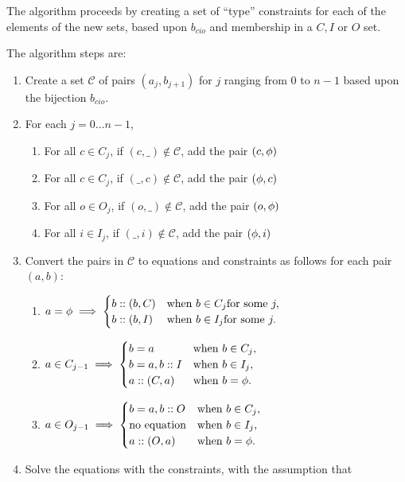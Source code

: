 The algorithm proceeds by creating a set of ``type'' constraints for each of
the elements of the new sets, based upon $b_{cio}$ and membership in a $C,I$
or $O$ set.

The algorithm steps are:
\begin{enumerate}
  \item Create a set $\mathcal{C}$ of pairs $(a_j,b_{j+1})$ for $j$
  ranging from $0$ to $n-1$ based upon the bijection $b_{cio}$.
  \item For each $j=0\ldots n-1$,
  \begin{enumerate}
    \item For all $c\in C_j$, if $(c,\_)\notin\mathcal{C}$,
      add the pair $(c,\phi)$
    \item For all $c\in C_j$, if $(\_,c)\notin\mathcal{C}$,
      add the pair $(\phi,c)$
    \item For all $o\in O_j$, if $(o,\_)\notin\mathcal{C}$,
      add the pair $(o,\phi)$
    \item For all $i\in I_j$, if $(\_,i)\notin\mathcal{C}$,
      add the pair $(\phi,i)$
  \end{enumerate}
  \item Convert the pairs in $\mathcal{C}$ to equations and constraints as
    follows for each pair $(a,b)$:
  \begin{enumerate}
    \item $a=\phi\implies \begin{cases}
      b::(b,C)&\text{when }b\in C_j\text{for some }j,\\
      b::(b,I)&\text{when }b\in I_j\text{for some }j.
    \end{cases}$
    \item $a\in C_{j-1}\implies \begin{cases}
      b=a&\text{when }b\in C_j,\\
      b=a, b::I&\text{when }b\in I_j,\\
      a::(C,a)&\text{when }b=\phi.
    \end{cases}$
    \item $a\in O_{j-1}\implies \begin{cases}
      b=a, b::O&\text{when }b\in C_j,\\
      \text{no equation}&\text{when }b\in I_j,\\
      a::(O,a)&\text{when }b=\phi.
    \end{cases}$
  \end{enumerate}
  \item Solve the equations with the constraints, with the assumption that

\end{enumerate}
